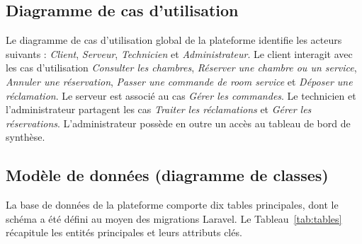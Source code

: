 \documentclass[12pt,a4paper]{report}
\begin{document}
\subsection{Diagramme de cas d'utilisation}

Le diagramme de cas d'utilisation global de la plateforme identifie les
acteurs suivants : \textit{Client}, \textit{Serveur}, \textit{Technicien}
et \textit{Administrateur}. Le client interagit avec les cas d'utilisation
\textit{Consulter les chambres}, \textit{Réserver une chambre ou un service},
\textit{Annuler une réservation}, \textit{Passer une commande de room service}
et \textit{Déposer une réclamation}. Le serveur est associé au cas
\textit{Gérer les commandes}. Le technicien et l'administrateur partagent
les cas \textit{Traiter les réclamations} et \textit{Gérer les réservations}.
L'administrateur possède en outre un accès au tableau de bord de synthèse.

\subsection{Modèle de données (diagramme de classes)}

La base de données de la plateforme comporte dix tables principales, dont
le schéma a été défini au moyen des migrations Laravel. Le Tableau~\ref{tab:tables}
récapitule les entités principales et leurs attributs clés.
\end{document}
